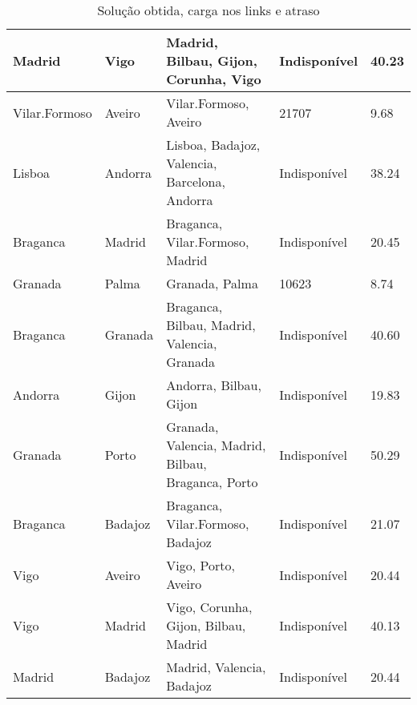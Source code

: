 \begin{table}[!htb]
{\begin{tabular}{|l|l|l|l|l|}
Madrid & Vigo & Madrid, Bilbau, Gijon, Corunha, Vigo & Indisponível & 40.23 \\ \hline
Vilar.Formoso & Aveiro & Vilar.Formoso, Aveiro & 21707 & 9.68 \\ \hline
Lisboa & Andorra & Lisboa, Badajoz, Valencia, Barcelona, Andorra & Indisponível & 38.24 \\ \hline
Braganca & Madrid & Braganca, Vilar.Formoso, Madrid & Indisponível & 20.45 \\ \hline
Granada & Palma & Granada, Palma & 10623 & 8.74 \\ \hline
Braganca & Granada & Braganca, Bilbau, Madrid, Valencia, Granada & Indisponível & 40.60 \\ \hline
Andorra & Gijon & Andorra, Bilbau, Gijon & Indisponível & 19.83 \\ \hline
Granada & Porto & Granada, Valencia, Madrid, Bilbau, Braganca, Porto & Indisponível & 50.29 \\ \hline
Braganca & Badajoz & Braganca, Vilar.Formoso, Badajoz & Indisponível & 21.07 \\ \hline
Vigo & Aveiro & Vigo, Porto, Aveiro & Indisponível & 20.44 \\ \hline
Vigo & Madrid & Vigo, Corunha, Gijon, Bilbau, Madrid & Indisponível & 40.13 \\ \hline
Madrid & Badajoz & Madrid, Valencia, Badajoz & Indisponível & 20.44 \\ \hline
\end{tabular}}
\caption[]{Solução obtida, carga nos links e atraso}
\end{table}

